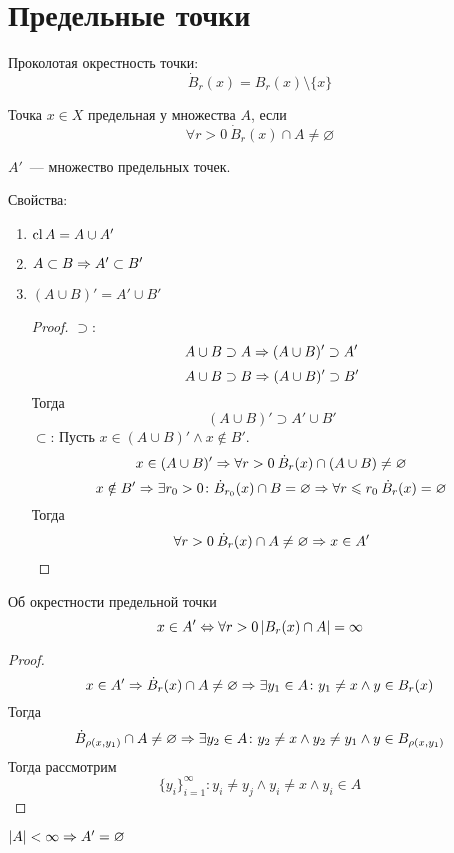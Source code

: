 ﻿\section{Предельные точки}

\begin{Def}
Проколотая окрестность точки:
$$\dot B_r(x) = B_r(x) \setminus \{x\}$$
\end{Def}
\begin{Def}
Точка $x \in X$ предельная у множества $A$, если
$$\forall r > 0\: \dot B_r(x) \cap A \ne \varnothing$$
\end{Def}
\begin{Def}
$A'$~--- множество предельных точек.
\end{Def}

Свойства:
\begin{enumerate}
\item $\operatorname{cl} A = A \cup A'$
\item $A \subset B \Rightarrow A' \subset B'$
\item $(A \cup B)' = A' \cup B'$
\begin{proof}
$\supset$:
$$A \cup B \supset A \Rightarrow (A \cup B)' \supset A'$$
$$A \cup B \supset B \Rightarrow (A \cup B)' \supset B'$$
Тогда $$(A \cup B)' \supset A' \cup B'$$
$\subset$: Пусть $x \in (A \cup B)' \land x \notin B'$.
$$x \in (A \cup B)' \Rightarrow \forall r > 0\: \dot B_r(x) \cap (A \cup B) \ne \varnothing$$
$$x \notin B' \Rightarrow \exists r_0 > 0\colon \dot B_{r_0}(x) \cap B = \varnothing \Rightarrow \forall r \leqslant r_0\: \dot B_r(x) = \varnothing$$
Тогда $$\forall r > 0\: \dot B_r(x) \cap A \ne \varnothing \Rightarrow x \in A'$$
\end{proof} 
\end{enumerate}

\begin{theorem}{Об окрестности предельной точки}
$$x \in A' \Leftrightarrow \forall r > 0 \left|B_r(x) \cap A\right| = \infty$$
\end{theorem}
\begin{proof}
$$x \in A' \Rightarrow \dot B_r(x) \cap A \ne \varnothing \Rightarrow \exists y_1 \in A\colon y_1 \ne x \land y \in B_r(x)$$
Тогда
$$\dot B_{\rho(x,y_1)} \cap A \ne \varnothing \Rightarrow \exists y_2 \in A\colon y_2 \ne x \land y_2 \ne y_1 \land y \in B_{\rho(x,y_1)}$$
Тогда рассмотрим
$$\{y_i\}_{i=1}^\infty\colon y_i \ne y_j \land y_i \ne x \land y_i \in A$$
\end{proof}
\begin{conseq}
$|A| < \infty \Rightarrow A' = \varnothing$
\end{conseq}